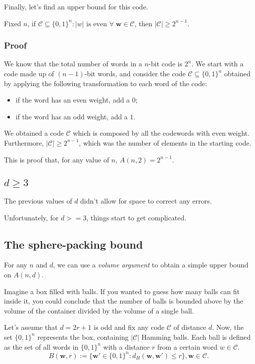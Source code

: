 Finally, let's find an upper bound for this code.
\begin{lemma}
    Fixed $n$, if $ \mathcal{C} \subseteq \{0,1\}^n : |w| \text{ is even }\forall\; \mathbf{w}\in \mathcal{C}$, then $|\mathcal{C}| \geq 2^{n-1}$.%
\end{lemma}
\subsubsection*{Proof}
We know that the total number of words in a $n$-bit code is $2^n$. We start with a code made up of $(n-1)$-bit words, and consider the code $\mathcal{C} \subseteq \{0,1\}^n$ obtained by applying the following transformation to each word of the code:
\begin{itemize}
    \item if the word has an even weight, add a $0$;
    \item if the word has an odd weight, add a $1$.
\end{itemize}

We obtained a code $\mathcal{C}$ which is composed by all the codewords with even weight. Furthermore, $|\mathcal{C}| \geq 2^{n-1}$, which was the number of elements in the starting code. %

This is proof that, for any value of $n$, $A(n,2) = 2^{n-1}$.

\subsection*{$d\geq 3$}
The previous values of $d$ didn't allow for space to correct any errors.

Unfortunately, for $d >= 3$, things start to get complicated.

\subsection{The sphere-packing bound}

For any $n$ and $d$, we can use a \emph{volume argument} to obtain a simple upper bound on $A(n, d)$.

Imagine a box filled with balls. If you wanted to guess how many balls can fit inside it, you could conclude that the number of balls is bounded above by the volume of the container divided by the volume of a single ball.

Let's assume that $d = 2r+1$ is odd and fix any code $\mathcal{C}$ of distance $d$. Now, the set $\{0,1\}^n$ represents the box, containing $|\mathcal{C}|$ Hamming balls. Each ball is defined as the set of all words in $\{0,1\}^n$ with a distance $r$ from a certain word $w \in \mathcal{C}$.
\begin{equation}
    B(\mathbf{w}, r) := \{\mathbf{w}' \in \{0,1\}^n : d_H(\mathbf{w}, \mathbf{w}') \leq r\}, \mathbf{w} \in \mathcal{C}.
\end{equation}

